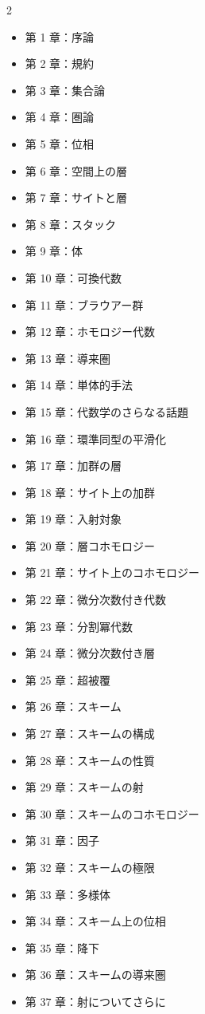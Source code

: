 \begin{multicols}{2}\begin{itemize}
\item 第 1 章：序論
\item 第 2 章：規約
\item 第 3 章：集合論
\item 第 4 章：圏論
\item 第 5 章：位相
\item 第 6 章：空間上の層
\item 第 7 章：サイトと層
\item 第 8 章：スタック
\item 第 9 章：体
\item 第 10 章：可換代数
\item 第 11 章：ブラウアー群
\item 第 12 章：ホモロジー代数
\item 第 13 章：導来圏
\item 第 14 章：単体的手法
\item 第 15 章：代数学のさらなる話題
\item 第 16 章：環準同型の平滑化
\item 第 17 章：加群の層
\item 第 18 章：サイト上の加群
\item 第 19 章：入射対象
\item 第 20 章：層コホモロジー
\item 第 21 章：サイト上のコホモロジー
\item 第 22 章：微分次数付き代数
\item 第 23 章：分割冪代数
\item 第 24 章：微分次数付き層
\item 第 25 章：超被覆
\item 第 26 章：スキーム
\item 第 27 章：スキームの構成
\item 第 28 章：スキームの性質
\item 第 29 章：スキームの射
\item 第 30 章：スキームのコホモロジー
\item 第 31 章：因子
\item 第 32 章：スキームの極限
\item 第 33 章：多様体
\item 第 34 章：スキーム上の位相
\item 第 35 章：降下
\item 第 36 章：スキームの導来圏
\item 第 37 章：射についてさらに

\end{itemize}
\end{multicols}
